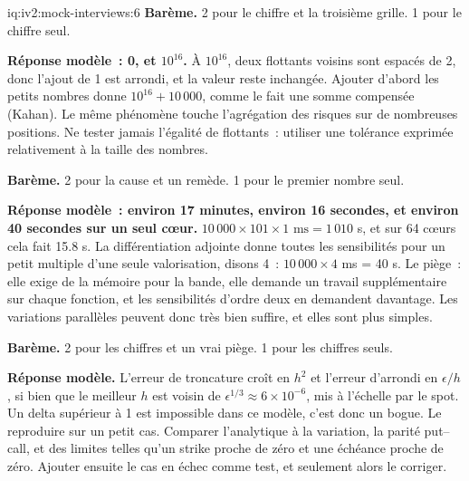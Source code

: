 \begin{solution}{iq:iv2:mock-interviews:6}
\textbf{Barème.} 2 pour le chiffre et la troisième grille. 1 pour le chiffre seul.

\ivstop
\textbf{Réponse modèle~: 0, et $10^{16}$.} À $10^{16}$, deux flottants voisins sont espacés de 2, donc l'ajout de 1 est arrondi, et la valeur reste inchangée. Ajouter d'abord les petits nombres donne $10^{16} + 10\,000$, comme le fait une somme compensée (Kahan). Le même phénomène touche l'agrégation des risques sur de nombreuses positions. Ne tester jamais l'égalité de flottants~: utiliser une tolérance exprimée relativement à la taille des nombres.

\textbf{Barème.} 2 pour la cause et un remède. 1 pour le premier nombre seul.

\ivstop
\textbf{Réponse modèle~: environ 17 minutes, environ 16 secondes, et environ 40 secondes sur un seul cœur.} $10\,000 \times 101 \times 1\text{ ms} = 1\,010$ s, et sur 64 cœurs cela fait 15.8 s. La différentiation adjointe donne toutes les sensibilités pour un petit multiple d'une seule valorisation, disons 4~: $10\,000 \times 4$ ms = 40 s. Le piège~: elle exige de la mémoire pour la bande, elle demande un travail supplémentaire sur chaque fonction, et les sensibilités d'ordre deux en demandent davantage. Les variations parallèles peuvent donc très bien suffire, et elles sont plus simples.

\textbf{Barème.} 2 pour les chiffres et un vrai piège. 1 pour les chiffres seuls.

\ivstop
\textbf{Réponse modèle.} L'erreur de troncature croît en $h^2$ et l'erreur d'arrondi en $\epsilon/h$, si bien que le meilleur $h$ est voisin de $\epsilon^{1/3} \approx 6 \times 10^{-6}$, mis à l'échelle par le spot. Un delta supérieur à 1 est impossible dans ce modèle, c'est donc un bogue. Le reproduire sur un petit cas. Comparer l'analytique à la variation, la parité put--call, et des limites telles qu'un strike proche de zéro et une échéance proche de zéro. Ajouter ensuite le cas en échec comme test, et seulement alors le corriger.


\end{solution}
